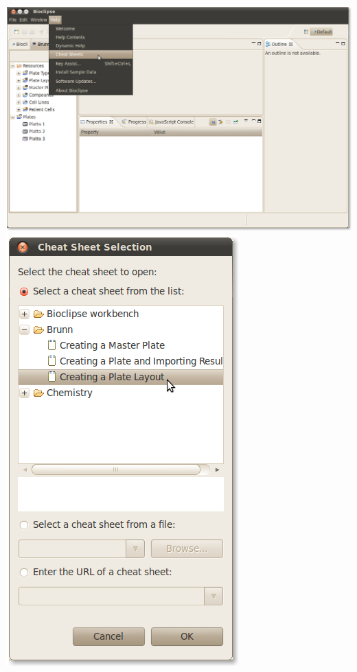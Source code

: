 \documentclass[12pt, a4paper, twoside, openany]{article}
\begin{document}
    \begin{center}
        \includegraphics[height=35ex]{images/3.png}
        \hfill
        \includegraphics[height=35ex]{images/4.png}
    \end{center}
\end{document}
